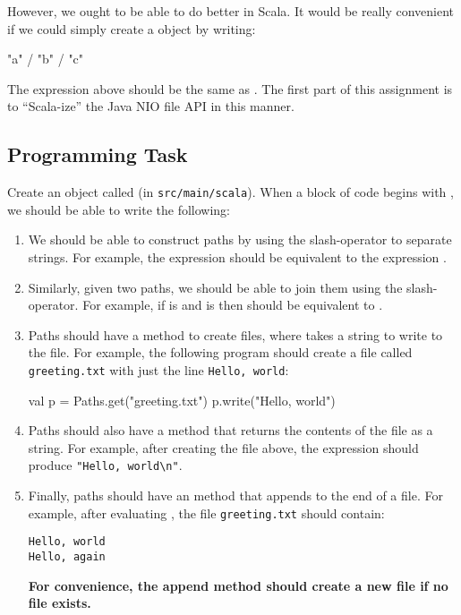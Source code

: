 However, we ought to be able to do better in Scala. It would be really convenient if we could simply create a  object by writing:
%
\begin{scalacode}
"a" / "b" / "c"	
\end{scalacode}
The expression above should be the same as .
The first part of this assignment is to ``Scala-ize'' the Java NIO file API in this manner.

\subsection{Programming Task}

Create an object called  (in \texttt{src/main/scala}). When a block of code begins with , we should be able to write the following:

\begin{enumerate}

  \item We should be able to construct paths by using the slash-operator to separate strings. For example, the expression  should be equivalent to the expression . 
  \item Similarly, given two paths, we should be able to join them using the slash-operator. For example, if  is  and  is  then  should be equivalent to . 
  \item Paths should have a  method to create files, where  takes a string to write to the file. For example, the following program should create a file called \texttt{greeting.txt} with just the line \texttt{Hello, world}: %
\begin{scalacode}
val p = Paths.get("greeting.txt")
p.write("Hello, world\n")
\end{scalacode}	

  \item Paths should also have a  method that returns the contents of the file as a string. For example, after creating the file above, the expression  should produce \verb|"Hello, world\n"|.

  \item Finally, paths should have an  method that appends to the end of a file. For example, after evaluating  , the file \texttt{greeting.txt} should contain:

\begin{verbatim}
Hello, world
Hello, again
\end{verbatim}

    \textbf{For convenience, the append method should create a new file if no file exists.}

\end{enumerate}

